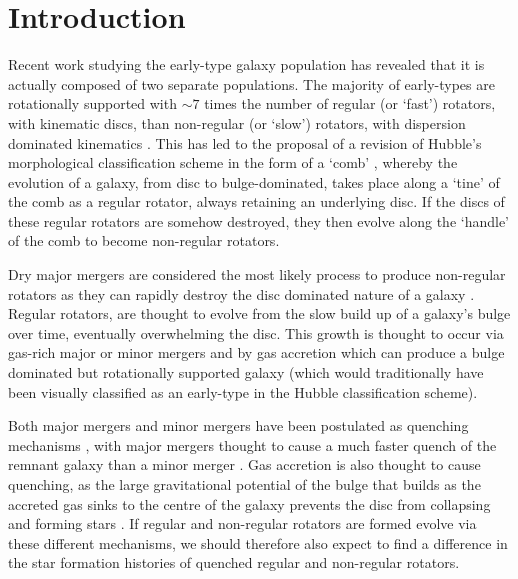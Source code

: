 \documentclass[useAMS,usenatbib]{mn2e}
\begin{document}
\section{Introduction}\label{sec:intro}

Recent work studying the early-type galaxy population has revealed that it is actually composed of two separate populations. The majority of early-types are rotationally supported \citep{emsellem11} with $\sim7$ times the number of regular (or `fast') rotators, with kinematic discs, than non-regular (or `slow') rotators, with dispersion dominated kinematics \citep{cappellari07, emsellem07}.  This has led to the proposal of a revision of Hubble's morphological classification scheme in the form of a `comb' \citep{cappellari16}, whereby the evolution of a galaxy, from  disc to bulge-dominated, takes place along a `tine' of the comb as a regular rotator, always retaining an underlying disc. If the discs of these regular rotators are somehow destroyed, they then evolve along the `handle' of the comb to become non-regular rotators. 

Dry major mergers are considered the most likely process to produce non-regular rotators \citep{duc11, naab14} as they can rapidly destroy the disc dominated nature of a galaxy \citep{toomre72}. %
Regular rotators, are thought to evolve from the slow build up of a galaxy's bulge over time, eventually overwhelming the disc. This growth is thought to occur via gas-rich major or minor mergers \citep{duc11} and by gas accretion \citep{cappellari13, johnston14} which can produce a bulge dominated but rotationally supported galaxy (which would traditionally have been visually classified as an early-type in the Hubble classification scheme). %

Both major mergers and minor mergers have been postulated as quenching mechanisms \citep{hopkins08a, snyder11, hayward14}, with major mergers thought to cause a much faster quench of the remnant galaxy than a minor merger \citep{lotz08b, lotz11}. Gas accretion is also thought to cause quenching, as the large gravitational potential of the bulge that builds as the accreted gas sinks to the centre of the galaxy prevents the disc from collapsing and forming stars \citep{fang13}. If regular and non-regular rotators are formed evolve via these different mechanisms, we should therefore also expect to find a difference in the star formation histories of quenched regular and non-regular rotators. 
\end{document}
